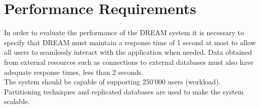 \section{Performance Requirements}

In order to evaluate the performance of the DREAM system it is necessary to specify that DREAM must maintain a response time of 1 second at most to allow all users to seamlessly interact with the application when needed. Data obtained from external resources such as connections to external databases must also have adequate response times, less than 2 seconds.\\
The system should be capable of supporting 250'000 users (workload).\\
Partitioning techniques and replicated databases are used to make the system scalable.
